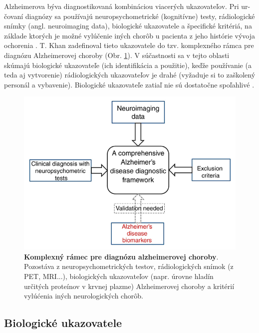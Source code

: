 Alzheimerova býva diagnostikovaná kombináciou viacerých ukazovateľov. Pri ur-čovaní diagnózy sa používajú neuropsychometrické (kognitívne) testy, rádiologické snímky (angl. neuroimaging data), biologické ukazovatele a špecifické kritériá, na základe ktorých je možné vylúčenie iných chorôb u pacienta z jeho histórie vývoja ochorenia \cite{khan2016biomarkers}. T. Khan zadefinoval tieto ukazovatele do tzv. komplexného rámca pre diagnózu Alzheimerovej choroby (Obr. \ref{fig:alzheimer_diagnosis_scheme}). V súčastnosti sa v tejto oblasti skúmajú biologické ukazovateľe (ich identifikácia a použitie), keďže používanie (a teda aj vytvorenie) rádiologických ukazovateľov je drahé \cite{khan2016biomarkers} (vyžaduje si to zaškolený personál a vybavenie). Biologické ukazovateľe zatiaľ nie sú dostatočne spoľahlivé \cite{khan2016biomarkers}.

\begin{figure}[h!]
\centering
\includegraphics[scale=0.35]{assets/images/alzhemier_diagnosis_scheme.png}
\caption{\textbf{Komplexný rámec pre diagnózu alzheimerovej choroby}. Pozostáva z neuropsychometrických testov, rádiologických snímok (z PET, MRI...), biologických ukazovateľov (napr. úrovne hladín určitých proteínov v krvnej plazme) Alzheimerovej choroby a kritérií vylúćenia iných neurologických chorôb.\cite{khan2016biomarkers}}
\label{fig:alzheimer_diagnosis_scheme}
\end{figure}

\subsection{Biologické ukazovatele}

